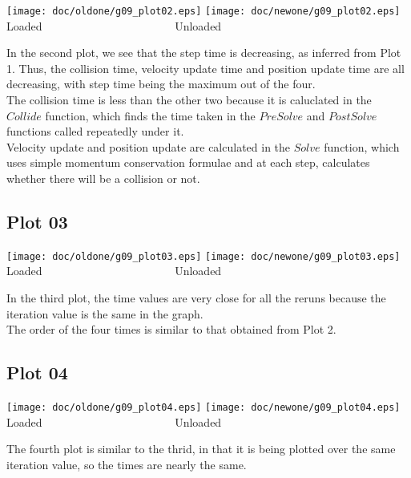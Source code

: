 \documentclass[a4paper,11pt]{article}
\begin{document}
\begin{center}
  \texttt{[image: doc/oldone/g09\_plot02.eps]}
  \texttt{[image: doc/newone/g09\_plot02.eps]}
\\  Loaded~~~~~~~~~~~~~~~~~~~~~~~ Unloaded  
\end{center}

In the second plot, we see that the step time is decreasing, as inferred from Plot 1. Thus, the collision time, velocity update time and position update time are all decreasing, with step time being the maximum out of the four.\\
The collision time is less than the other two because it is caluclated in the $Collide$ function, which finds the time taken in the  $PreSolve$ and $PostSolve$ functions called repeatedly under it.\\
Velocity update and position update are calculated in the $Solve$ function, which uses simple momentum conservation formulae and at each step, calculates whether there will be a collision or not.

\subsection*{Plot 03}

\begin{center}
  \texttt{[image: doc/oldone/g09\_plot03.eps]}
  \texttt{[image: doc/newone/g09\_plot03.eps]}
\\  Loaded~~~~~~~~~~~~~~~~~~~~~~~ Unloaded  
\end{center}

In the third plot, the time values are very close for all the reruns because the iteration value is the same in the graph.\\
The order of the four times is similar to that obtained from Plot 2.

\subsection*{Plot 04}

\begin{center}
  \texttt{[image: doc/oldone/g09\_plot04.eps]}
  \texttt{[image: doc/newone/g09\_plot04.eps]}
\\  Loaded~~~~~~~~~~~~~~~~~~~~~~~ Unloaded  
\end{center}

The fourth plot is similar to the thrid, in that it is being plotted over the same iteration value, so the times are nearly the same.
\end{document}
